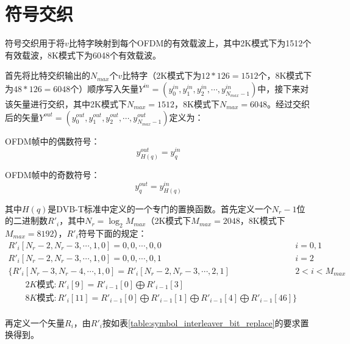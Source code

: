 	\section{符号交织}
		\par 符号交织用于将$v$比特字映射到每个OFDM的有效载波上，其中2K模式下为1512个有效载波，8K模式下为6048个有效载波。
		\par 首先将比特交织输出的$N_{max}$个$v$比特字（2K模式下为$12*126=1512$个，8K模式下为$48*126=6048$个）顺序写入矢量$Y^{in}=(y_0^{in},y_1^{in},y_2^{in},\cdots,y_{N_{max}-1}^{in})$中，接下来对该矢量进行交织，其中2K模式下$N_{max}=1512$，8K模式下$N_{max}=6048$。经过交织后的矢量$Y^{out}=(y_0^{out},y_1^{out},y_2^{out},\cdots,y_{N_{max}-1}^{out})$定义为：
		\par OFDM帧中的偶数符号：
		\begin{equation}
			y_{H(q)}^{out}=y_q^{in}
		\end{equation}
		\par OFDM帧中的奇数符号：
		\begin{equation}
			y_q^{out}=y_{H(q)}^{in}
		\end{equation}
		\par 其中$H(q)$是DVB-T标准中定义的一个专门的置换函数。首先定义一个$N_r-1$位的二进制数$R'_i$，其中$N_r=\log_{2}M_{max}$（2K模式下$M_{max}=2048$，8K模式下$M_{max}=8192$），$R'_i$符号下面的规定：
		\begin{equation}
			\begin{array}{ll}
				R'_i[N_r-2,N_r-3,\cdots,1,0]=0,0,\cdots,0,0                                                                       & i={0,1}     \\
				R'_i[N_r-2,N_r-3,\cdots,1,0]=0,0,\cdots,0,1                                                                       & i=2         \\
				\{R'_i[N_r-3,N_r-4,\cdots,1,0]=R'_i[N_r-2,N_r-3,\cdots,2,1]                                                       & 2<i<M_{max} \\
				\quad\quad 2K\text{模式}:R'_i[9]=R'_{i-1}[0]\bigoplus R'_{i-1}[3]                                               &             \\
				\quad\quad 8K\text{模式}:R'_i[11]=R'_{i-1}[0]\bigoplus R'_{i-1}[1]\bigoplus R'_{i-1}[4]\bigoplus R'_{i-1}[46]\} &             \\
			\end{array}
		\end{equation}
		\par 再定义一个矢量$R_i$，由$R'_i$按如表\ref{table:symbol_interleaver_bit_replace}的要求置换得到。
